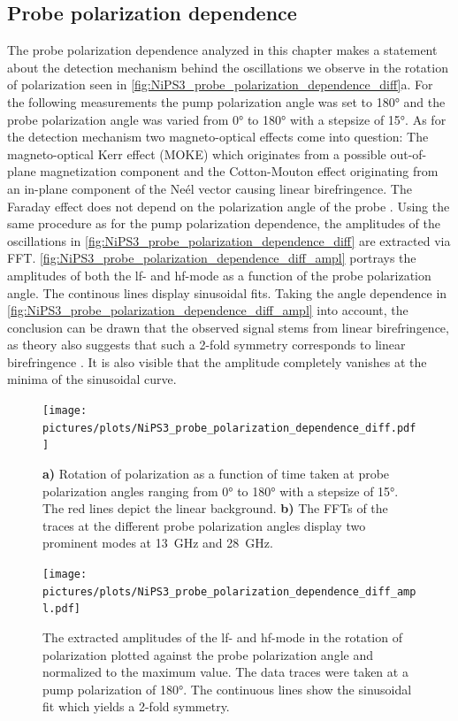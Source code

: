 \subsection{Probe polarization dependence}
The probe polarization dependence analyzed in this chapter makes a statement about the detection mechanism behind the oscillations we observe in the rotation of polarization seen in \autoref{fig:NiPS3_probe_polarization_dependence_diff}a.
For the following measurements the pump polarization angle was set to 180° and the probe polarization angle was varied from 0° to 180° with a stepsize of 15°.
As for the detection mechanism two magneto-optical effects come into question:
The magneto-optical Kerr effect (MOKE) which originates from a possible out-of-plane magnetization component and the Cotton-Mouton effect originating from an in-plane component of the Neél vector causing linear birefringence.
The Faraday effect does not depend on the polarization angle of the probe .
Using the same procedure as for the pump polarization dependence, the amplitudes of the oscillations in \autoref{fig:NiPS3_probe_polarization_dependence_diff} are extracted via FFT.
\autoref{fig:NiPS3_probe_polarization_dependence_diff_ampl} portrays the amplitudes of both the lf- and hf-mode as a function of the probe polarization angle.
The continous lines display sinusoidal fits.
Taking the angle dependence in \autoref{fig:NiPS3_probe_polarization_dependence_diff_ampl} into account, the conclusion can be drawn that the observed signal stems from linear birefringence, as theory also suggests that such a 2-fold symmetry corresponds to linear birefringence .
It is also visible that the amplitude completely vanishes at the minima of the sinusoidal curve.
\begin{figure}[hbt!]
    \centering
    \texttt{[image: pictures/plots/NiPS3\_probe\_polarization\_dependence\_diff.pdf]} \vspace{-0.3cm}
    \caption{\textbf{a)} Rotation of polarization as a function of time taken at probe polarization angles ranging from 0° to 180° with a stepsize of 15°. The red lines depict the linear background. \textbf{b)} The FFTs of the traces at the different probe polarization angles display two prominent modes at \qty{13}{GHz} and \qty{28}{GHz}.}
    \label{fig:NiPS3_probe_polarization_dependence_diff}
\end{figure}
\begin{figure}[hbt!]
    \centering  
    \texttt{[image: pictures/plots/NiPS3\_probe\_polarization\_dependence\_diff\_ampl.pdf]} \vspace{-0.3cm}
    \caption{The extracted amplitudes of the lf- and hf-mode in the rotation of polarization plotted against the probe polarization angle and normalized to the maximum value. The data traces were taken at a pump polarization of 180°. The continuous lines show the sinusoidal fit which yields a 2-fold symmetry.}
    \label{fig:NiPS3_probe_polarization_dependence_diff_ampl}
\end{figure}
